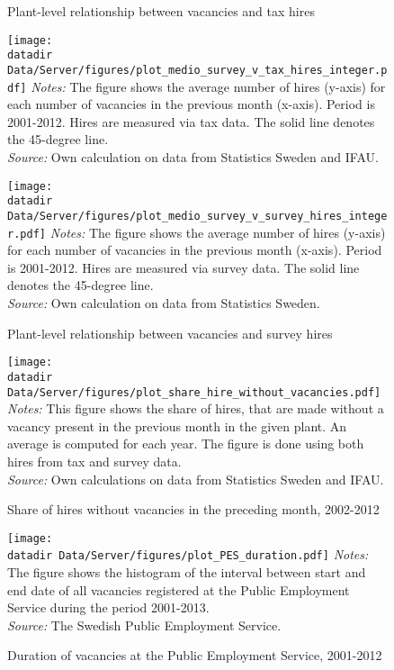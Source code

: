 \begin{figure}[t]

\centering
\caption{Plant-level relationship between vacancies and tax hires}
\texttt{[image: \\datadir Data/Server/figures/plot\_medio\_survey\_v\_tax\_hires\_integer.pdf]}
\flushleft
\footnotesize{\emph{Notes:} The figure shows the average number of hires (y-axis) for each number of vacancies in the previous month (x-axis). Period is 2001-2012. Hires are measured via tax data. The solid line denotes the 45-degree line.} \\
\footnotesize{\emph{Source:} Own calculation on data from Statistics Sweden and IFAU.}
\label{fig:crossplot_using_tax_hires}

\vspace{2mm}

\centering
\caption{Plant-level relationship between vacancies and survey hires}
\texttt{[image: \\datadir Data/Server/figures/plot\_medio\_survey\_v\_survey\_hires\_integer.pdf]}
\flushleft
\footnotesize{\emph{Notes:} The figure shows the average number of hires (y-axis) for each number of vacancies in the previous month (x-axis). Period is 2001-2012. Hires are measured via survey data. The solid line denotes the 45-degree line.} \\
\footnotesize{\emph{Source:} Own calculation on data from Statistics Sweden.}
\label{fig:crossplot_using_survey_hires}

\end{figure}

\begin{figure}[t]
\centering
\caption{Share of hires without vacancies in the preceding month, 2002-2012}
\texttt{[image: \\datadir Data/Server/figures/plot\_share\_hire\_without\_vacancies.pdf]}
\flushleft
\footnotesize{\emph{Notes:} This figure shows the share of hires, that are made without a vacancy present in the previous month in the given plant. An average is computed for each year. The figure is done using both hires from tax and survey data.} \\
\footnotesize{\emph{Source:} Own calculations on data from Statistics Sweden and IFAU.}
\label{fig:share_without}
\end{figure}

\begin{figure}[t]
\centering
\caption{Duration of vacancies at the Public Employment Service, 2001-2012}
\texttt{[image: \\datadir Data/Server/figures/plot\_PES\_duration.pdf]}
\flushleft
\footnotesize{\emph{Notes:} The figure shows the histogram of the interval between start and end date of all vacancies registered at the Public Employment Service during the period 2001-2013.} \\
\footnotesize{\emph{Source:} The Swedish Public Employment Service.}
\label{fig:PES_duration}
\end{figure}

